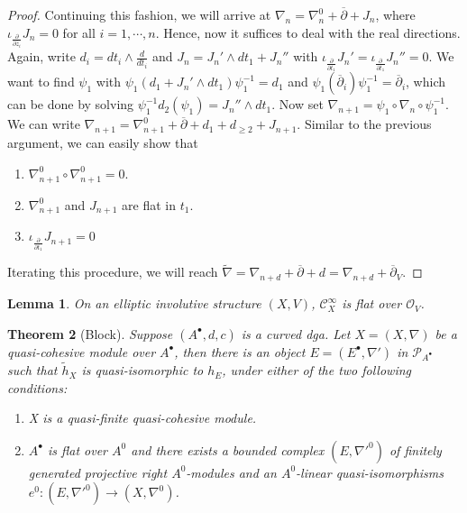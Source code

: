 \documentclass[12pt]{amsart}
\newtheorem{thm}{Theorem}[section]
\newtheorem{lem}[thm]{Lemma}
\newtheorem{prop}[thm]{Proposition}
\theoremstyle{definition}
\theoremstyle{remark}
\numberwithin{equation}{section}
\newcommand{\del}{\partial}
\renewcommand{\del}{\partial}
\newcommand{\delb}{\overline{\partial}}
\newcommand{\CO}{{\mathcal O}}
\newcommand{\cinf}{{\mathcal C}^{\infty}}
\newcommand{\R}{{\mathbb{R}}}
\newcommand{\1}{{\mathbb{1}}}
\begin{document}
\begin{proof}
    Continuing this fashion, we will arrive at $\nabla_n = \nabla^0_n + \overline{\del} + J_n$, where $\iota_{\frac{\del }{\del \overline{z}_i}} J_n =0$ for all $i = 1, \cdots, n$. Hence, now it suffices to deal with the real directions. Again, write $d_i = dt_i \wedge \frac{d}{d {t}_i}$ and $J_n = J_n'\wedge dt_1 + J_n''$ with $\iota_{\frac{\del}{\del t_1}}J_n' = \iota_{\frac{\del}{\del t_1}}J_n'' = 0$. We want to find $\psi_1$ with $\psi_1(d_1 + J_n'\wedge dt_1) \psi_1^{-1} = d_1$ and $\psi_1(\overline{\del}_i)\psi_1^{-1}= \overline{\del}_i$, which can be done by solving $\psi_1^{-1}d_2(\psi_1) = J_n'' \wedge dt_1$. Now set $\nabla_{n+1} = \psi_1\circ \nabla_n \circ \psi_1^{-1}$. We can write $\nabla_{n+1} = \nabla_{n+1}^0 + \overline{\del}+d_1 + d_{\ge 2} + J_{n+1}$. Similar to the previous argument, we can easily show that 
    \begin{enumerate}
        \item $\nabla_{n+1}^0\circ \nabla_{n+1}^0 = 0.$
        \item $\nabla_{n+1}^0$ and $J_{n+1}$ are flat in $t_1$.
        \item $\iota_{\frac{\del }{\del t_1}} J_{n+1} = 0$
    \end{enumerate}
    
    
    
    Iterating this procedure, we will reach $\widetilde{\nabla} = \nabla_{n+d} + \delb + d = \nabla_{n+d} + \delb_V$.
    
    
\end{proof}
\begin{lem}
    On an elliptic involutive structure $(X, V)$, $\cinf_X$ is flat over $\CO_V$.
\end{lem}

\begin{thm}[Block\cite{Blo05}]\label{quasicohesive}
    Suppose $(A^{\bullet}, d,c)$ is a curved dga. Let $X = (X, \nabla)$ be a quasi-cohesive module over $A^{\bullet}$, then there is an object $E = (E^{\bullet}, \nabla')$ in $\mathcal{P}_{A^{\bullet}}$ such that $\tilde{h}_X$ is quasi-isomorphic to $h_E$, under either of the two following conditions:
    
    \begin{enumerate}
        \item X is a quasi-finite quasi-cohesive module.
        \item $A^{\bullet}$ is flat over $A^{0}$ and there exists a bounded complex $(E, \nabla'^0)$ of finitely generated projective right $A^0$-modules and an $A^0$-linear quasi-isomorphisms $e^0: (E, \nabla'^0) \to (X, \nabla^0)$.
    \end{enumerate}
\end{thm}
\end{document}
